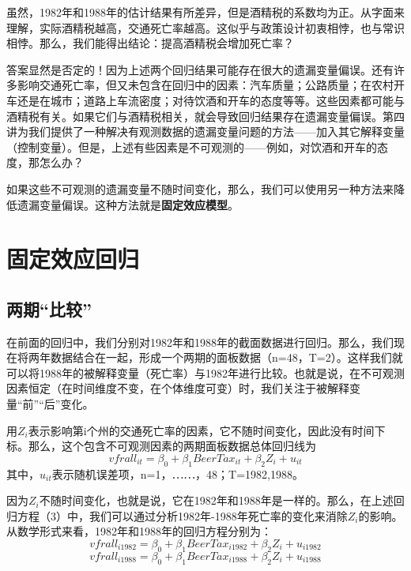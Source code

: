 \documentclass[cn,12pt,math=newtx,citestyle=gb7714-2015,bibstyle=gb7714-2015]{elegantbook}
\begin{document}
虽然，1982年和1988年的估计结果有所差异，但是酒精税的系数均为正。从字面来理解，实际酒精税越高，交通死亡率越高。这似乎与政策设计初衷相悖，也与常识相悖。那么，我们能得出结论：提高酒精税会增加死亡率？

答案显然是否定的！因为上述两个回归结果可能存在很大的遗漏变量偏误。还有许多影响交通死亡率，但又未包含在回归中的因素：汽车质量；公路质量；在农村开车还是在城市；道路上车流密度；对待饮酒和开车的态度等等。这些因素都可能与酒精税有关。如果它们与酒精税相关，就会导致回归结果存在遗漏变量偏误。第四讲为我们提供了一种解决有观测数据的遗漏变量问题的方法——加入其它解释变量（控制变量）。但是，上述有些因素是不可观测的——例如，对饮酒和开车的态度，那怎么办？

如果这些不可观测的遗漏变量不随时间变化，那么，我们可以使用另一种方法来降低遗漏变量偏误。这种方法就是\textbf{固定效应模型}。

\section{固定效应回归}
\subsection{两期“比较”}
在前面的回归中，我们分别对1982年和1988年的截面数据进行回归。那么，我们现在将两年数据结合在一起，形成一个两期的面板数据（n=48，T=2）。这样我们就可以将1988年的被解释变量（死亡率）与1982年进行比较。也就是说，在不可观测因素恒定（在时间维度不变，在个体维度可变）时，我们关注于被解释变量“前”“后”变化。

用$Z_i$表示影响第i个州的交通死亡率的因素，它不随时间变化，因此没有时间下标。那么，这个包含不可观测因素的两期面板数据总体回归线为
\begin{equation}
	vfrall_{it}=\beta_{0}+\beta_{1}BeerTax_{it}+\beta_{2}Z_i+u_{it}
\end{equation}
其中，$u_{it}$表示随机误差项，n=1，⋯⋯，48；T=1982,1988。

因为$Z_i$不随时间变化，也就是说，它在1982年和1988年是一样的。那么，在上述回归方程（3）中，我们可以通过分析1982年-1988年死亡率的变化来消除$Z_i$的影响。从数学形式来看，1982年和1988年的回归方程分别为：
\begin{equation}
	vfrall_{i1982}=\beta_{0}+\beta_{1}BeerTax_{i1982}+\beta_{2}Z_i+u_{i1982}
\end{equation}
\begin{equation}
	vfrall_{i1988}=\beta_{0}+\beta_{1}BeerTax_{i1988}+\beta_{2}Z_i+u_{i1988}
\end{equation}
\end{document}
